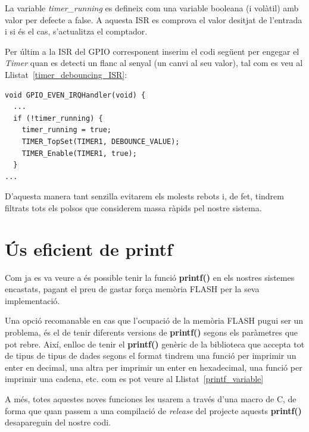 La variable {\em timer\_running} es defineix com una variable booleana (i volàtil) amb valor per defecte a false. A aquesta \gls{ISR} es comprova el valor desitjat de l'entrada i si és el cas, s'actualitza el comptador.

Per últim a la ISR del \gls{GPIO} corresponent inserim el codi següent per engegar el {\em Timer} quan es detecti un flanc al senyal (un canvi al seu valor), tal com es veu al Llistat~\ref{timer_debouncing_ISR}:

\begin{lstlisting}[style=customc, caption=Codi per engegar el timer a la ISR del GPIO, label=timer_debouncing_ISR]
void GPIO_EVEN_IRQHandler(void) {
  ...
  if (!timer_running) {
    timer_running = true;
    TIMER_TopSet(TIMER1, DEBOUNCE_VALUE);
    TIMER_Enable(TIMER1, true);
  }
...
\end{lstlisting}

D'aquesta manera tant senzilla evitarem els molests rebots i, de fet, tindrem filtrats tots els polsos que considerem massa ràpids pel nostre sistema.

\section{Ús eficient de printf}

Com ja es va veure a  és possible tenir la funció {\bf printf()} en els nostres sistemes encastats, pagant el preu de gastar força memòria \gls{FLASH} per la seva implementació.

Una opció recomanable en cas que l'ocupació de la memòria FLASH pugui ser un problema, és el de tenir diferents versions de {\bf printf()} segons els paràmetres que pot rebre. Així, enlloc de tenir el {\bf printf()} genèric de la biblioteca que accepta tot de tipus de tipus de dades segons el format tindrem una funció per imprimir un enter en decimal, una altra per imprimir un enter en hexadecimal, una funció per imprimir una cadena, etc. com es pot veure al Llistat~\ref{printf_variable}

A més, totes aquestes noves funciones les usarem a través d'una \gls{macro} de C, de forma que quan passem a una compilació de {\em release} del projecte aquests {\bf printf()} desapareguin del nostre codi. 

